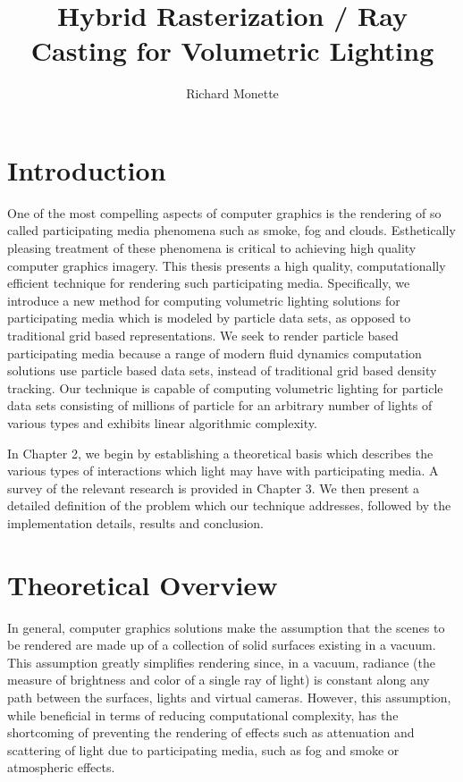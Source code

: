 \documentclass{article}
\title{Hybrid Rasterization / Ray Casting for Volumetric Lighting}
\author{Richard Monette}
\begin{document}
\maketitle
\pagebreak[4]
\tableofcontents
\pagebreak[4]

\section{Introduction}

One of the most compelling aspects of computer graphics is the rendering of so called participating media phenomena such as smoke, fog and clouds. Esthetically pleasing treatment of these phenomena is critical to achieving high quality computer graphics imagery. This thesis presents a high quality, computationally efficient technique for rendering such participating media. Specifically, we introduce a new method for computing volumetric lighting solutions for participating media which is modeled by particle data sets, as opposed to traditional grid based representations. We seek to render particle based participating media because a range of modern fluid dynamics computation solutions use particle based data sets, instead of traditional grid based density tracking. Our technique is capable of computing volumetric lighting for particle data sets consisting of millions of particle for an arbitrary number of lights of various types and exhibits linear algorithmic complexity. 

In Chapter 2, we begin by establishing a theoretical basis which describes the various types of interactions which light may have with participating media. A survey of the relevant research is provided in Chapter 3. We then present a detailed definition of the problem which our technique addresses, followed by the implementation details, results and conclusion.

\section{Theoretical Overview}

In general, computer graphics solutions make the assumption that the scenes to be rendered are made up of a collection of solid surfaces existing in a vacuum. This assumption greatly simplifies rendering since, in a vacuum, radiance (the measure of brightness and color of a single ray of light\cite{RTR3}) is constant along any path between the surfaces, lights and virtual cameras. However, this assumption, while beneficial in terms of reducing computational complexity, has the shortcoming of preventing the rendering of effects such as attenuation and scattering of light due to participating media, such as fog and smoke or atmospheric effects.
\end{document}
